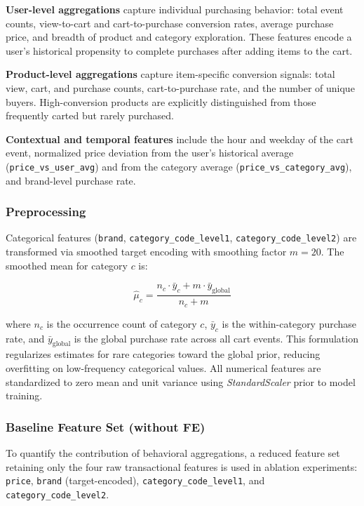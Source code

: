\documentclass[conference]{IEEEtran}
\begin{document}
\textbf{User-level aggregations} capture individual purchasing 
behavior: total event counts, view-to-cart and 
cart-to-purchase conversion rates, average purchase price, and 
breadth of product and category exploration. These features 
encode a user's historical propensity to complete purchases 
after adding items to the cart.

\textbf{Product-level aggregations} capture item-specific 
conversion signals: total view, cart, and purchase counts, 
cart-to-purchase rate, and the number of unique buyers. 
High-conversion products are explicitly distinguished from 
those frequently carted but rarely purchased.

\textbf{Contextual and temporal features} include the hour and 
weekday of the cart event, normalized price deviation from 
the user's historical average (\texttt{price\_vs\_user\_avg}) 
and from the category average (\texttt{price\_vs\_category\_avg}), 
and brand-level purchase rate.

\subsubsection{Preprocessing}
Categorical features (\texttt{brand}, \texttt{category\_code\_level1}, 
\texttt{category\_code\_level2}) are transformed via smoothed 
target encoding with smoothing factor $m = 20$. The 
smoothed mean for category $c$ is:

\begin{equation}
    \hat{\mu}_c = \frac{n_c \cdot \bar{y}_c 
                  + m \cdot \bar{y}_{\text{global}}}
                 {n_c + m}
    \label{eq:target_encoding}
\end{equation}

\noindent where $n_c$ is the occurrence count of category $c$, 
$\bar{y}_c$ is the within-category purchase rate, and 
$\bar{y}_{\text{global}}$ is the global purchase rate across 
all cart events. This formulation regularizes estimates for rare categories 
toward the global prior, reducing overfitting on 
low-frequency categorical values. All numerical features 
are standardized to zero mean and unit variance using 
\textit{StandardScaler} prior to model training.

\subsubsection{Baseline Feature Set (without FE)}
To quantify the contribution of behavioral aggregations, 
a reduced feature set retaining only the four raw 
transactional features is used in ablation experiments: 
\texttt{price}, \texttt{brand} (target-encoded), 
\texttt{category\_code\_level1}, and 
\texttt{category\_code\_level2}.
\end{document}

